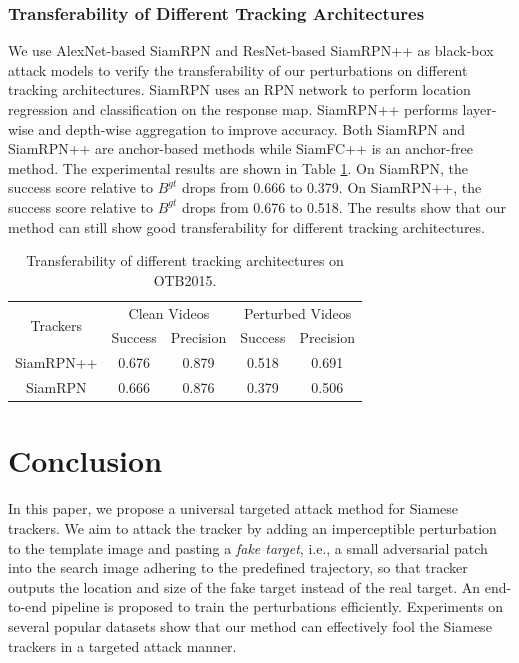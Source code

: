 \documentclass{article}
\begin{document}
\subsubsection{Transferability of Different Tracking Architectures}

We use AlexNet-based SiamRPN \cite{SiamRPN} and ResNet-based SiamRPN++ \cite{SiamRPN++} as black-box attack models to verify the transferability of our perturbations on different tracking architectures.
SiamRPN uses an RPN network to perform location regression and classification on the response map. SiamRPN++ performs layer-wise and depth-wise aggregation to improve accuracy. Both SiamRPN and SiamRPN++ are anchor-based methods while SiamFC++ is an anchor-free method.
The experimental results are shown in Table \ref{tab:arch}. On SiamRPN, the success score relative to $B^{gt}$ drops from 0.666 to 0.379. On SiamRPN++, the success score relative to $B^{gt}$ drops from 0.676 to 0.518. The results show that our method can still show good transferability for different tracking architectures.

\begin{table}[t]
\centering
\scriptsize
\tabcolsep=2.0pt
\begin{tabular}{c|cc|cc} 
\toprule
\multirow{2}{*}[-2pt]{Trackers} & \multicolumn{2}{c|}{Clean Videos} & \multicolumn{2}{c}{Perturbed Videos}  \\
\cmidrule{2-5}
                          & Success & Precision              & Success & Precision                   \\
\midrule
SiamRPN++                 & 0.676   & 0.879                  & 0.518   & 0.691                       \\
SiamRPN                   & 0.666   & 0.876                  & 0.379   & 0.506                       \\
\bottomrule
\end{tabular}
\caption{Transferability of different tracking architectures on OTB2015.}
\label{tab:arch}
\end{table}

\section{Conclusion}

In this paper, we propose a universal targeted attack method for Siamese trackers. 
We aim to attack the tracker by adding an imperceptible perturbation to the template image and pasting a \textit{fake target}, i.e., a small adversarial patch into the search image adhering to the predefined trajectory, so that tracker outputs the location and size of the fake target instead of the real target. An end-to-end pipeline is proposed to train the perturbations efficiently.
Experiments on several popular datasets show that our method can effectively fool the Siamese trackers in a targeted attack manner.
\end{document}
